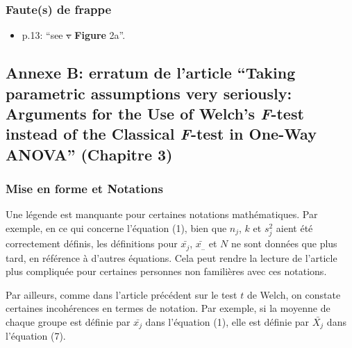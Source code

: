 \documentclass[
  12pt,
  french,
]{article}
\providecommand{\tightlist}{%
  \setlength{\itemsep}{0pt}\setlength{\parskip}{0pt}}
\begin{document}
\hypertarget{fautes-de-frappe}{%
\subsubsection{Faute(s) de frappe}\label{fautes-de-frappe}}

\begin{itemize}
\tightlist
\item
  p.13: ``see \sout{v} \textbf{Figure} 2a''.
\end{itemize}

\newpage

\hypertarget{annexe-b-erratum-de-larticle-taking-parametric-assumptions-very-seriously-arguments-for-the-use-of-welchs-f-test-instead-of-the-classical-f-test-in-one-way-anova-chapitre-3}{%
\subsection{\texorpdfstring{Annexe B: erratum de l'article ``Taking
parametric assumptions very seriously: Arguments for the Use of Welch's
\emph{F}-test instead of the Classical \emph{F}-test in One-Way ANOVA''
(Chapitre
3)}{Annexe B: erratum de l'article ``Taking parametric assumptions very seriously: Arguments for the Use of Welch's F-test instead of the Classical F-test in One-Way ANOVA'' (Chapitre 3)}}\label{annexe-b-erratum-de-larticle-taking-parametric-assumptions-very-seriously-arguments-for-the-use-of-welchs-f-test-instead-of-the-classical-f-test-in-one-way-anova-chapitre-3}}

\hypertarget{mise-en-forme-et-notations-1}{%
\subsubsection{Mise en forme et
Notations}\label{mise-en-forme-et-notations-1}}

Une légende est manquante pour certaines notations mathématiques. Par
exemple, en ce qui concerne l'équation (1), bien que \(n_j\), \(k\) et
\(s^2_j\) aient été correctement définis, les définitions pour
\(\bar{x_j}\), \(\bar{x_{..}}\) et \(N\) ne sont données que plus tard,
en référence à d'autres équations. Cela peut rendre la lecture de
l'article plus compliquée pour certaines personnes non familières avec
ces notations.

Par ailleurs, comme dans l'article précédent sur le test \(t\) de Welch,
on constate certaines incohérences en termes de notation. Par exemple,
si la moyenne de chaque groupe est définie par \(\bar{x_j}\) dans
l'équation (1), elle est définie par \(\bar{X_j}\) dans l'équation (7).
\end{document}
